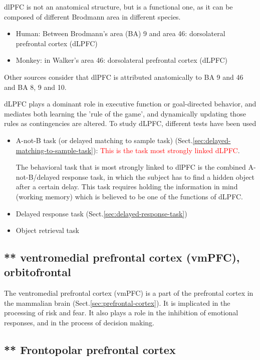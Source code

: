 dlPFC is not an anatomical structure, but is a 
functional one, as it can be composed of different Brodmann area in different
species.
\begin{itemize}
  \item Human: Between Brodmann's area (BA) 9 and area 46: dorsolateral
  prefrontal cortex (dLPFC)

  \item Monkey: in Walker's area 46: dorsolateral prefrontal cortex (dLPFC)
\end{itemize}
Other sources consider that dlPFC is attributed anatomically to BA 9 and 46
and BA 8, 9 and 10.

dLPFC plays a dominant role in executive function or goal-directed behavior, and
mediates both learning the 'rule of the game', and dynamically updating those
rules as contingencies are altered.
To study dLPFC, different tests have been used
\begin{itemize}
  \item A-not-B task (or delayed
  matching to sample task) (Sect.\ref{sec:delayed-matching-to-sample-task}):
  \textcolor{red}{This is the task most strongly linked dLPFC}.
  
  The behavioral task that is most strongly linked to dlPFC is the combined
  A-not-B/delayed response task, in which the subject has to find a hidden
  object after a certain delay. 
  This task requires holding the information in mind (working memory) which is
  believed to be one of the functions of dLPFC.
  
  \item Delayed response task (Sect.\ref{sec:delayed-response-task})
  
  \item Object retrieval task 
\end{itemize} 

\subsection{** ventromedial prefrontal cortex (vmPFC), orbitofrontal}
\label{sec:ventromedial prefrontal cortex}
\label{sec:vmPFC}

The ventromedial prefrontal cortex (vmPFC) is a part of the prefrontal cortex in
the mammalian brain  (Sect.\ref{sec:prefrontal-cortex}). It is implicated in the
processing of risk and fear. It also plays a role in the inhibition of emotional
responses, and in the process of decision making.


\subsection{** Frontopolar prefrontal cortex}
\label{sec:frontopolar-prefrontal-cortex}
 
